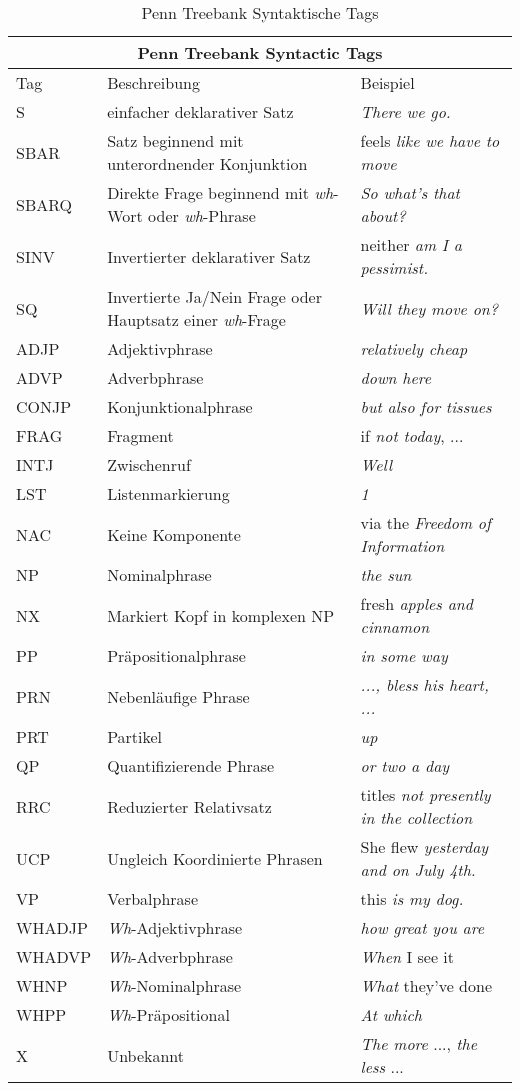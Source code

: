 \begin{table}
\begin{tabular}{ | l p{7cm} p{4cm} |}
	\hline
	\multicolumn{3}{|c|}{Penn Treebank Syntactic Tags} \\
	\hline
	\hline
	Tag & Beschreibung & Beispiel \\
	\hline
	S & einfacher deklarativer Satz & \textit{There we go.} \\
	SBAR & Satz beginnend mit unterordnender Konjunktion & feels \textit{like we have to move} \\
	SBARQ & Direkte Frage beginnend mit \textit{wh}-Wort oder \textit{wh}-Phrase & \textit{So what's that about?} \\
	SINV & Invertierter deklarativer Satz & neither \textit{am I a pessimist.} \\
	SQ & Invertierte Ja/Nein Frage oder Hauptsatz einer \textit{wh}-Frage & \textit{Will they move on?} \\
	
	ADJP & Adjektivphrase & \textit{relatively cheap} \\
	ADVP & Adverbphrase & \textit{down here} \\
	CONJP & Konjunktionalphrase &  \textit{but also for tissues}\\
	FRAG & Fragment & if \textit{not today}, ... \\
	INTJ & Zwischenruf &  \textit{Well} \\
	LST & Listenmarkierung & \textit{1} \\
	NAC & Keine Komponente & via the \textit{Freedom of Information} \\
	NP & Nominalphrase & \textit{the sun} \\
	NX & Markiert Kopf in komplexen NP & fresh \textit{apples and cinnamon} \\
	PP & Präpositionalphrase & \textit{in some way} \\
	PRN & Nebenläufige Phrase & \textit{..., bless his heart, ...} \\
	PRT & Partikel & \textit{up} \\
	QP & Quantifizierende Phrase & \textit{or two a day} \\
	RRC & Reduzierter Relativsatz & titles \textit{not presently in the collection} \\
	UCP & Ungleich Koordinierte Phrasen & She flew \textit{yesterday and on July 4th.} \\
	VP & Verbalphrase & this \textit{is my dog.} \\
	WHADJP	& \textit{Wh}-Adjektivphrase & \textit{how great you are} \\
	WHADVP & \textit{Wh}-Adverbphrase & \textit{When} I see it\\
	WHNP & \textit{Wh}-Nominalphrase & \textit{What} they've done \\
	WHPP & \textit{Wh}-Präpositional & \textit{At which} \\
	X & Unbekannt & \textit{The more} ..., \textit{the less} ... \\	
	
	\hline
\end{tabular}
\caption{Penn Treebank Syntaktische Tags} %
\label{tab:phrase-tags}
\end{table}
